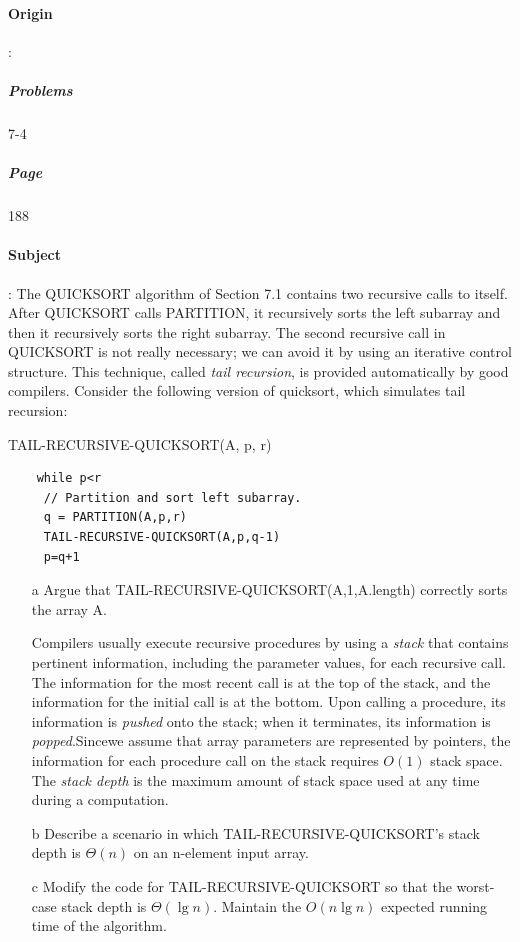 \documentclass{article}
\begin{document}
  \paragraph{Origin}:
    \subparagraph{Problems}7-4
    \subparagraph{Page}188
  \paragraph{Subject}:
  The QUICKSORT algorithm of Section 7.1 contains two recursive calls to itself. After QUICKSORT calls PARTITION, it recursively sorts the left subarray and then it recursively sorts the right subarray. The second recursive call in QUICKSORT is not really necessary; we can avoid it by using an iterative control structure. This technique, called \textit{tail recursion}, is provided automatically by good compilers. Consider the following version of quicksort, which simulates tail recursion:

  TAIL-RECURSIVE-QUICKSORT(A, p, r)

  \begin{lstlisting}
    while p<r
     // Partition and sort left subarray.
     q = PARTITION(A,p,r)
     TAIL-RECURSIVE-QUICKSORT(A,p,q-1)
     p=q+1
  \end{lstlisting}

  \begin{enumerate}
    \item[a] Argue that TAIL-RECURSIVE-QUICKSORT(A,1,A.length) correctly sorts the array A.
    

    Compilers usually execute recursive procedures by using a \textit{stack} that contains pertinent information, including the parameter values, for each recursive call. The information for the most recent call is at the top of the stack, and the information for the initial call is at the bottom. Upon calling a procedure, its information is \textit{pushed} onto the stack; when it terminates, its information is \textit{popped}.Sincewe assume that array parameters are represented by pointers, the information for each procedure call on the stack requires $O(1)$ stack space. The \textit{stack depth} is the maximum amount of stack space used at any time during a computation.
    
    
    \item[b] Describe a scenario in which TAIL-RECURSIVE-QUICKSORT's stack depth is $\Theta(n)$ on an n-element input array.
    \item[c] Modify the code for TAIL-RECURSIVE-QUICKSORT so that the worst-case stack depth is $\Theta(\lg n)$. Maintain the $O(n \lg n)$ expected running time of the algorithm.
  \end{enumerate}
\end{document}
